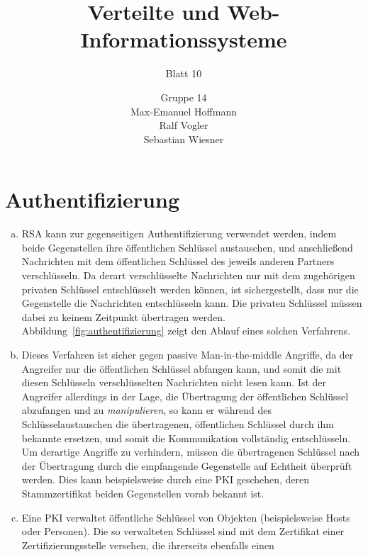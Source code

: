 \documentclass[11pt,a4paper]{scrartcl}
\begin{document}
\author{Gruppe 14\\Max-Emanuel Hoffmann\\Ralf Vogler\\Sebastian Wiesner}
\title{Verteilte und Web-Informationssysteme}
\subtitle{Blatt 10}

\maketitle

\setcounter{section}{1}

\section{Authentifizierung}

\begin{enumerate}[a)]
\item RSA kann zur gegenseitigen Authentifizierung verwendet werden, indem
  beide Gegenstellen ihre öffentlichen Schlüssel austauschen, und anschließend
  Nachrichten mit dem öffentlichen Schlüssel des jeweils anderen Partners
  verschlüsseln.  Da derart verschlüsselte Nachrichten nur mit dem zugehörigen
  privaten Schlüssel entschlüsselt werden können, ist sichergestellt, dass nur
  die Gegenstelle die Nachrichten entschlüsseln kann.  Die privaten Schlüssel
  müssen dabei zu keinem Zeitpunkt übertragen werden.
  Abbildung~\ref{fig:authentifizierung} zeigt den Ablauf eines solchen
  Verfahrens.
\item Dieses Verfahren ist sicher gegen passive Man-in-the-middle Angriffe, da
  der Angreifer nur die öffentlichen Schlüssel abfangen kann, und somit die mit
  diesen Schlüsseln verschlüsselten Nachrichten nicht lesen kann.  Ist der
  Angreifer allerdings in der Lage, die Übertragung der öffentlichen Schlüssel
  abzufangen und zu \emph{manipulieren}, so kann er während des
  Schlüsselaustauschen die übertragenen, öffentlichen Schlüssel durch ihm
  bekannte ersetzen, und somit die Kommunikation vollständig entschlüsseln.  Um
  derartige Angriffe zu verhindern, müssen die übertragenen Schlüssel nach der
  Übertragung durch die empfangende Gegenstelle auf Echtheit überprüft werden.
  Dies kann beispielsweise durch eine PKI geschehen, deren Stammzertifikat
  beiden Gegenstellen vorab bekannt ist.
\item Eine PKI verwaltet öffentliche Schlüssel von Objekten (beispielsweise
  Hosts oder Personen).  Die so verwalteten Schlüssel sind mit dem Zertifikat
  einer Zertifizierungsstelle versehen, die ihrerseits ebenfalls einen

\end{enumerate}
\end{document}
